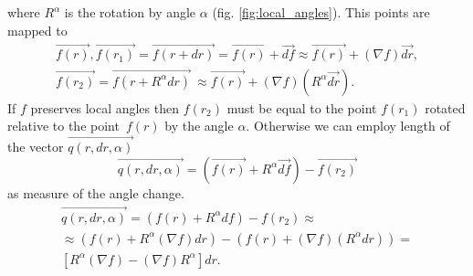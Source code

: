 \documentclass{article}
\newcommand{\vect}{\overrightarrow}
\begin{document}
where $R^\alpha$ is the rotation by angle $\alpha$ (fig. \ref{fig:local_angles}). This points are mapped to 
\begin{multline*}
  \vect{f(r)}, 
  \vect{f(r_1)} = \vect{f(r + dr)} = \vect{f(r)} + \vect{df} \approx \vect{f(r)} + (\nabla f) \vect{dr}, \\
  \vect{f(r_2)} = \vect{f(r + R^\alpha dr)} ~\approx \vect{f(r)} + (\nabla f)(R^\alpha \vect{dr}).
\end{multline*}
If $f$ preserves local angles then $f(r_2)$ must be equal to the point $f(r_1)$ rotated relative to the point~$f(r)$ by the angle $\alpha$. Otherwise we can employ length of the vector $\vect{q(r, dr, \alpha)}$
$$\vect{q(r, dr, \alpha)} = \left(\vect{f(r)} + R^\alpha \vect{df}\right) - \vect{f(r_2)}$$ as measure of the angle change.
\begin{multline}
\label{formula:angle_change_vec}
  \vect{q(r, dr, \alpha)} = \left(f(r) + R^\alpha df\right) - f(r_2) \approx \\
  \approx (f(r) + R^\alpha (\nabla f) dr) - (f(r) + (\nabla f)(R^\alpha dr)) = \\ 
  \left[R^\alpha (\nabla f) - (\nabla f) R^\alpha \right] dr. 
\end{multline}
\end{document}
